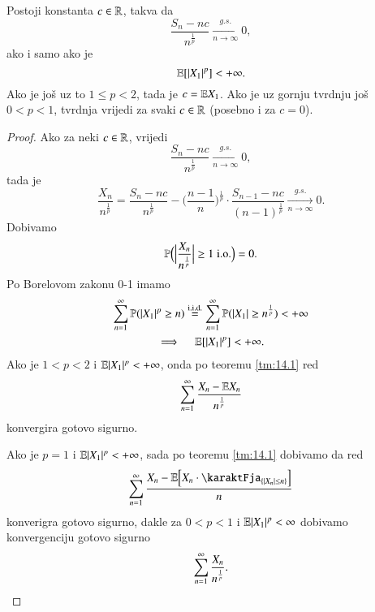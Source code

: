 \begin{tm}  \label{tm:14.2}
    Postoji konstanta $c \in \mathbb{R}$, takva da
    \begin{equation*}
        \frac{S_n - nc}{n^\frac{1}{p}} \xrightarrow[n \to \infty]{g.s.} 0,
    \end{equation*}
    ako i samo ako je
    \begin{equation*}
        \mathbb{E} [ |X_1|^p ] < + \infty.
    \end{equation*}
    Ako je jo\v s uz to $1 \leq p < 2$, tada je $c = \mathbb{E} X_1$.
    Ako je uz gornju tvrdnju jo\v s $0 < p <1$, tvrdnja vrijedi za svaki $c \in \mathbb{R}$ (posebno i za $c = 0$).
\end{tm}

\begin{proof}
    Ako za neki $c \in \mathbb{R}$, vrijedi
    \begin{equation*}
        \frac{S_n - nc}{n^\frac{1}{p}} \xrightarrow[n \to \infty]{g.s.} 0,
    \end{equation*}
    tada je
    \begin{equation*}
        \frac{X_n}{n^\frac{1}{p}} = \frac{S_n - nc}{n^\frac{1}{p}} - \Big( \frac{n - 1}{n} \Big)^\frac{1}{p} \cdot \frac{S_{n - 1} - nc}{(n - 1)^\frac{1}{p}} \xrightarrow[n \to \infty]{g.s.} 0.
    \end{equation*}
    Dobivamo
    \begin{equation*}
        \mathbb{P} \Big( \Big| \frac{X_n}{n^\frac{1}{p}} \Big| \geq 1 \; \mathrm{i.o.} \Big) = 0.
    \end{equation*}
    Po Borelovom zakonu 0-1 imamo
    \begin{equation*}
        \begin{gathered}
            \sum\limits_{n = 1}^{\infty} \mathbb{P} ( |X_1|^p \geq n ) \overset{\mathrm{i.i.d.}}{=} \sum\limits_{n = 1}^{\infty} \mathbb{P} (|X_1| \geq n^\frac{1}{p}) < +\infty\\
            \implies \quad \mathbb{E} [ |X_1|^p ] < +\infty.
        \end{gathered}
    \end{equation*}
    Ako je $1 < p <2$ i $\mathbb{E} |X_1|^p < +\infty$, onda po teoremu \ref{tm:14.1} red
    \begin{equation*}
        \sum\limits_{n = 1}^{\infty} \frac{X_n - \mathbb{E} X_n}{n^\frac{1}{p}}
    \end{equation*}
    konvergira gotovo sigurno.

    Ako je $p = 1$ i $\mathbb{E} |X_1|^p < +\infty$, sada po teoremu \ref{tm:14.1} dobivamo da red
    \begin{equation*}
        \suma{n = 1}{\infty} \frac{X_n - \masE \Big[ X_n \cdot \karaktFja_{\{ |X_n| \leq n \}} \Big]}{n}
    \end{equation*}
    konverigra gotovo sigurno, dakle za $0 < p <1$ i $\mathbb{E} |X_1|^p < \infty$ dobivamo konvergenciju gotovo sigurno
    \begin{equation*}
        \sum\limits_{n = 1}^{\infty} \frac{X_n}{n^\frac{1}{p}}.
    \end{equation*}
    

\end{proof}
